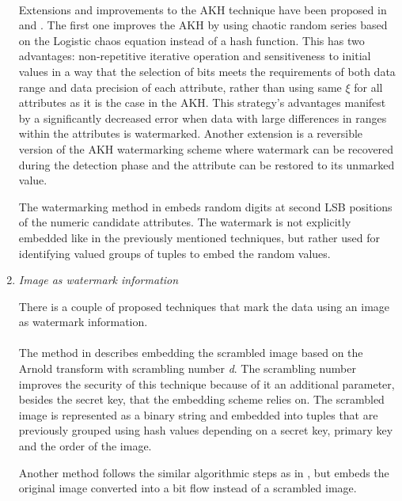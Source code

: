 \begin{enumerate}[leftmargin=*]
\paragraph{}
Extensions and improvements to the AKH technique have been proposed in \cite{qin2006watermark} and \cite{gupta2009database}. 
The first one \cite{qin2006watermark} improves the AKH by using chaotic random series based on the Logistic chaos equation instead of a hash function. 
This has two advantages: non-repetitive iterative operation and sensitiveness to initial values in a way that the selection of bits meets the requirements of both data range and data precision of each attribute, rather than using same $\xi$ for all attributes as it is the case in the AKH. 
This strategy's advantages manifest by a significantly decreased error when data with large differences in ranges within the attributes is watermarked. 
Another extension is a reversible version of the AKH watermarking scheme \cite{gupta2009database} where watermark can be recovered during the detection phase and the attribute can be restored to its unmarked value.

The watermarking method in \cite{xiao2007second} embeds random digits at second LSB positions of the numeric candidate attributes. The watermark is not explicitly embedded like in the previously mentioned techniques, but rather used for identifying valued groups of tuples to embed the random values.

\item \textit{Image as watermark information}

There is a couple of proposed techniques that mark the data using an image as watermark information.
\paragraph{}
The method in \cite{wang2008atbam} describes embedding the scrambled image based on the Arnold transform with scrambling number \textit{d}. 
The scrambling number improves the security of this technique because of it an additional parameter, besides the secret key, that the embedding scheme relies on.
The scrambled image is represented as a binary string and embedded into tuples that are previously grouped using hash values depending on a secret key, primary key and the order of the image. 

Another method \cite{hu2009image} follows the similar algorithmic steps as in \cite{wang2008atbam}, but embeds the original image converted into a bit flow instead of a scrambled image.


\end{enumerate}
